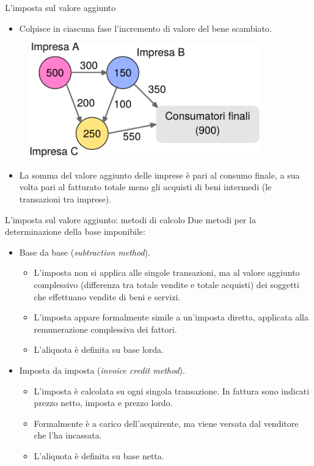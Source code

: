 \documentclass[11pt,italian]{beamer}
\begin{document}
\begin{frame}{L'imposta sul valore aggiunto}
\begin{itemize}
\item Colpisce in ciascuna fase l'\alert{incremento} di valore del bene scambiato.
\end{itemize}

\begin{figure}[htbp]
\centering
\includegraphics[width=10cm]{./figure/flussi-VA-metaflow-1.pdf}
\end{figure}

\begin{itemize}
\item La somma del valore aggiunto delle imprese è pari al consumo finale, a sua
volta pari al fatturato totale meno gli acquisti di beni intermedi (le
transazioni tra imprese).
\end{itemize}
\end{frame}

\begin{frame}{L'imposta sul valore aggiunto: metodi di calcolo}
Due metodi per la determinazione della base imponibile:
\begin{itemize}
\item \alert{Base da base (\emph{subtraction method})}.
\begin{itemize}
\item L'imposta non si applica alle singole transazioni, ma al valore aggiunto
complessivo (differenza tra totale vendite e totale acquisti) dei soggetti
che effettuano vendite di beni e servizi.
\item L'imposta appare formalmente simile a un'imposta diretta, applicata alla
remunerazione complessiva dei fattori.
\item L'aliquota è definita \alert{su base lorda}.
\end{itemize}

\item \alert{Imposta da imposta (\emph{invoice credit method})}.
\begin{itemize}
\item L'imposta è calcolata su ogni singola transazione. In fattura sono
indicati prezzo netto, imposta e prezzo lordo.
\item Formalmente è a carico dell'acquirente, ma viene versata dal venditore che
l'ha incassata.
\item L'aliquota è definita \alert{su base netta}.
\end{itemize}
\end{itemize}
\end{frame}
\end{document}
